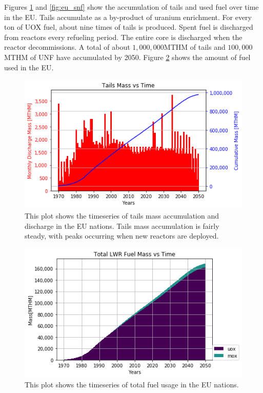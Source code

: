 Figures \ref{fig:eu_tail} and \ref{fig:eu_snf} show the 
accumulation of tails and used fuel over time in the \gls{EU}.
Tails accumulate as a by-product of uranium enrichment. For every
ton of \gls{UOX} fuel, about nine times of tails is produced. 
Spent fuel is discharged from reactors every refueling period.
The entire core is discharged when the reactor decommissions.
A total of about $1,000,000$MTHM of tails and $100,000$MTHM of
\gls{UNF} have accumulated by 2050.
Figure \ref{fig:eu_fuel} shows the amount of fuel used in the \gls{EU}.


\begin{figure}[htbp!]
	\begin{center}
		\includegraphics[scale=0.7]{./images/eu_future/tails.png}
	\end{center}
	\caption{This plot shows the timeseries of tails mass accumulation and discharge in the \gls{EU} nations.
			 Tails mass accumulation is fairly steady, with peaks occurring when
			 new reactors are deployed.}
	\label{fig:eu_tail}
\end{figure}

\begin{figure}[htbp!]
	\begin{center}
		\includegraphics[scale=0.7]{./images/eu_future/total_fuel.png}
	\end{center}
	\caption{This plot shows the timeseries of total fuel usage in the \gls{EU} nations.}
	\label{fig:eu_fuel}
\end{figure}


